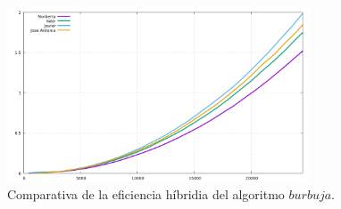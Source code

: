\documentclass[11pt,a4paper]{article}
\begin{document}
\begin{figure}[H]
	\centering
	\includegraphics[width=0.8\textwidth]{../plots/burbuja}
	\caption{Comparativa de la eficiencia híbridia del algoritmo $burbuja$.}
\end{figure}
\end{document}
